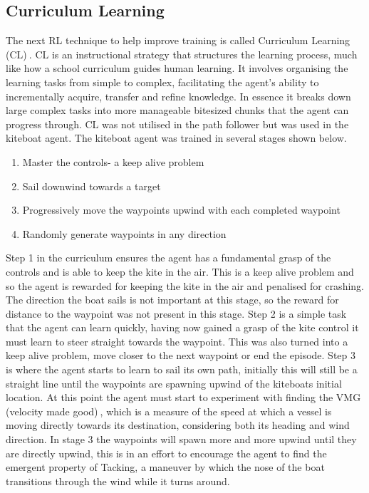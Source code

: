 \subsection{Curriculum Learning}
The next RL technique to help improve training is called Curriculum Learning (CL)$~$\cite{curriculumLearning}. CL is an instructional strategy that structures the learning process, much like how a school curriculum guides human learning. It involves organising the learning tasks from simple to complex, facilitating the agent's ability to incrementally acquire, transfer and refine knowledge. In essence it breaks down large complex tasks into more manageable bitesized chunks that the agent can progress through. CL was not utilised in the path follower but was used in the kiteboat agent. The kiteboat agent was trained in several stages shown below.
\begin{enumerate}
    \item Master the controls- a keep alive problem
    \item Sail downwind towards a target
    \item Progressively move the waypoints upwind with each completed waypoint
    \item Randomly generate waypoints in any direction 
\end{enumerate}

Step 1 in the curriculum ensures the agent has a fundamental grasp of the controls and is able to keep the kite in the air. This is a keep alive problem and so the agent is rewarded for keeping the kite in the air and penalised for crashing. The direction the boat sails is not important at this stage, so the reward for distance to the waypoint was not present in this stage. Step 2 is a simple task that the agent can learn quickly, having now gained a grasp of the kite control it must learn to steer straight towards the waypoint. This was also turned into a keep alive problem, move closer to the next waypoint or end the episode. Step 3 is where the agent starts to learn to sail its own path, initially this will still be a straight line until the waypoints are spawning upwind of the kiteboats initial location. At this point the agent must start to experiment with finding the VMG (velocity made good)$~$\cite{vmg}, which is a measure of the speed at which a vessel is moving directly towards its destination, considering both its heading and wind direction. In stage 3 the waypoints will spawn more and more upwind until they are directly upwind, this is in an effort to encourage the agent to find the emergent property of Tacking, a maneuver by which the nose of the boat transitions through the wind while it turns around.  

